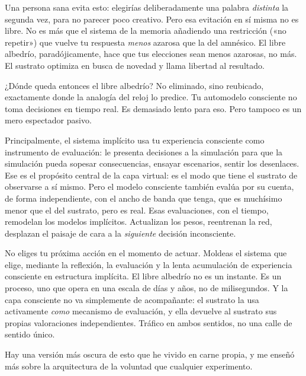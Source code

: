 \documentclass[11pt, twoside, openright]{book}
\begin{document}
Una persona sana evita esto: elegirías deliberadamente una palabra \textit{distinta} la segunda vez, para no parecer poco creativo. Pero esa evitación en sí misma no es libre. No es más que el sistema de la memoria añadiendo una restricción («no repetir») que vuelve tu respuesta \textit{menos} azarosa que la del amnésico. El libre albedrío, paradójicamente, hace que tus elecciones sean menos azarosas, no más. El sustrato optimiza en busca de novedad y llama libertad al resultado.

¿Dónde queda entonces el libre albedrío? No eliminado, sino reubicado, exactamente donde la analogía del reloj lo predice. Tu automodelo consciente no toma decisiones en tiempo real. Es demasiado lento para eso. Pero tampoco es un mero espectador pasivo.

Principalmente, el sistema implícito usa tu experiencia consciente como instrumento de evaluación: le presenta decisiones a la simulación para que la simulación pueda sopesar consecuencias, ensayar escenarios, sentir los desenlaces. Ese es el propósito central de la capa virtual: es el modo que tiene el sustrato de observarse a sí mismo. Pero el modelo consciente también evalúa por su cuenta, de forma independiente, con el ancho de banda que tenga, que es muchísimo menor que el del sustrato, pero es real. Esas evaluaciones, con el tiempo, remodelan los modelos implícitos. Actualizan los pesos, reentrenan la red, desplazan el paisaje de cara a la \textit{siguiente} decisión inconsciente.

No eliges tu próxima acción en el momento de actuar. Moldeas el sistema que elige, mediante la reflexión, la evaluación y la lenta acumulación de experiencia consciente en estructura implícita. El libre albedrío no es un instante. Es un proceso, uno que opera en una escala de días y años, no de milisegundos. Y la capa consciente no va simplemente de acompañante: el sustrato la usa activamente \textit{como} mecanismo de evaluación, y ella devuelve al sustrato sus propias valoraciones independientes. Tráfico en ambos sentidos, no una calle de sentido único.

Hay una versión más oscura de esto que he vivido en carne propia, y me enseñó más sobre la arquitectura de la voluntad que cualquier experimento.
\end{document}
